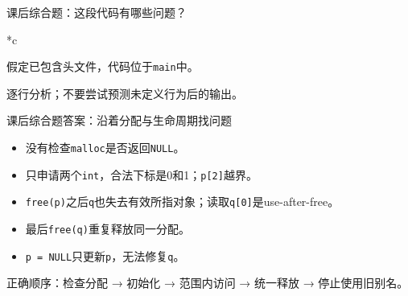 \begin{frame}{课后综合题：这段代码有哪些问题？}
\begin{Code}*{c}\end{Code}假定已包含头文件，代码位于\texttt{main}中。\par\medskip\alert{逐行分析；不要尝试预测未定义行为后的输出。}
\end{frame}

\begin{frame}{课后综合题答案：沿着分配与生命周期找问题}
\begin{itemize}
\item 没有检查\texttt{malloc}是否返回\texttt{NULL}。
\item 只申请两个\texttt{int}，合法下标是0和1；\texttt{p[2]}越界。
\item \texttt{free(p)}之后\texttt{q}也失去有效所指对象；读取\texttt{q[0]}是use-after-free。
\item 最后\texttt{free(q)}重复释放同一分配。
\item \texttt{p = NULL}只更新\texttt{p}，无法修复\texttt{q}。
\end{itemize}
\medskip\alert{正确顺序：检查分配 → 初始化 → 范围内访问 → 统一释放 → 停止使用旧别名。}
\end{frame}
